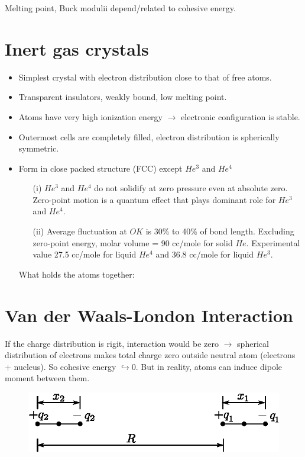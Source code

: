 Melting point, Buck modulii depend/related to cohesive energy.

\section*{Inert gas crystals}
\begin{itemize}
\itemsep=0pt
\item Simplest crystal with electron distribution close to that of free atoms.

\item Transparent insulators, weakly bound, low melting point.

\item Atoms have very high ionization energy $\to$ electronic configuration is stable.

\item Outermost cells are completely filled, electron distribution is spherically symmetric.

\item Form in close packed structure (FCC) except $He^{3}$ and $He^{4}$
\begin{itemize}
\itemsep=0pt
\item[(i)] $He^{3}$ and $He^{4}$ do not solidify at zero pressure even at absolute zero. Zero-point motion is a quantum effect that plays dominant role for $He^{3}$ and $He^{4}$.

\item[(ii)] Average fluctuation at $OK$ is 30\% to 40\% of bond length. Excluding zero-point energy, molar volume = 90 cc/mole for solid $He$. Experimental value 27.5 cc/mole for liquid $He^{4}$ and 36.8 cc/mole for liquid $He^{3}$.
\end{itemize}
What holds the atoms together:
\end{itemize}

\section*{Van der Waals-London Interaction}

If the charge distribution is rigit, interaction would be zero $\to$ spherical distribution of electrons makes total charge zero outside neutral atom (electrons + nucleus). So cohesive energy $\hookrightarrow 0$. But in reality, atoms can induce dipole moment between them.
\begin{figure}[H]
\centering
\includegraphics{images/lecture15/fig1.eps}
\end{figure}

